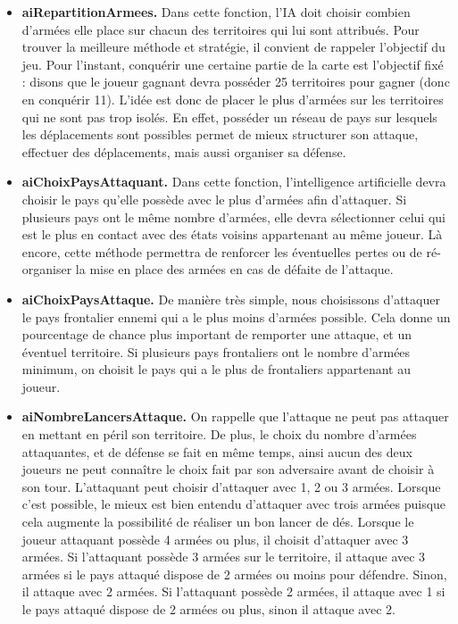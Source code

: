 \begin{itemize}
    \item \textbf{aiRepartitionArmees.} 
    Dans cette fonction, l'IA doit choisir combien d'armées elle place sur chacun des territoires qui lui sont attribués. Pour trouver la meilleure méthode et stratégie, il convient de rappeler l'objectif du jeu. Pour l'instant, conquérir une certaine partie de la carte est l'objectif fixé : disons que le joueur gagnant devra posséder 25 territoires pour gagner (donc en conquérir 11). L'idée est donc de placer le plus d'armées sur les territoires qui ne sont pas trop isolés. En effet, posséder un réseau de pays sur lesquels les déplacements sont possibles permet de mieux structurer son attaque, effectuer des déplacements, mais aussi organiser sa défense.
    \newline
    
    \item \textbf{aiChoixPaysAttaquant.}
    Dans cette fonction, l'intelligence artificielle devra choisir le pays qu'elle possède avec le plus d'armées afin d'attaquer. Si plusieurs pays ont le même nombre d'armées, elle devra sélectionner celui qui est le plus en contact avec des états voisins appartenant au même joueur. Là encore, cette méthode permettra de renforcer les éventuelles pertes ou de ré-organiser la mise en place des armées en cas de défaite de l'attaque. 
    \newline
    
    \item \textbf{aiChoixPaysAttaque.}
   De manière très simple, nous choisissons d'attaquer le pays frontalier ennemi qui a le plus moins d'armées possible. Cela donne un pourcentage de chance plus important de remporter une attaque, et un éventuel territoire. Si plusieurs pays frontaliers ont le nombre d'armées minimum, on choisit le pays qui a le plus de frontaliers appartenant au joueur.
   \newline
   
   \item \textbf{aiNombreLancersAttaque.}
    On rappelle que l'attaque ne peut pas attaquer en mettant en péril son territoire. De plus, le choix du nombre d'armées attaquantes, et de défense se fait en même temps, ainsi aucun des deux joueurs ne peut connaître le choix fait par son adversaire avant de choisir à son tour. 
    \newline
    L'attaquant peut choisir d'attaquer avec 1, 2 ou 3 armées. Lorsque c'est possible, le mieux est bien entendu d'attaquer avec trois armées puisque cela augmente la possibilité de réaliser un bon lancer de dés. Lorsque le joueur attaquant possède 4 armées ou plus, il choisit d'attaquer avec 3 armées. Si l'attaquant possède 3 armées sur le territoire, il attaque avec 3 armées si le pays attaqué dispose de 2 armées ou moins pour défendre. Sinon, il attaque avec 2 armées. Si l'attaquant possède 2 armées, il attaque avec 1 si le pays attaqué dispose de 2 armées ou plus, sinon il attaque avec 2. 
    \newline
    

\end{itemize}
